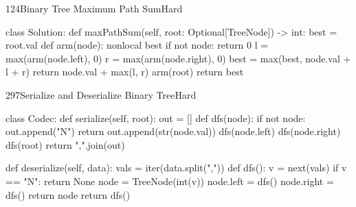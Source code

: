 \begin{problem}{124}{Binary Tree Maximum Path Sum}{Hard}
\begin{code}
class Solution:
    def maxPathSum(self, root: Optional[TreeNode]) -> int:
        best = root.val
        def arm(node):
            nonlocal best
            if not node:
                return 0
            l = max(arm(node.left), 0)
            r = max(arm(node.right), 0)
            best = max(best, node.val + l + r)
            return node.val + max(l, r)
        arm(root)
        return best
\end{code}
\end{problem}

\begin{problem}{297}{Serialize and Deserialize Binary Tree}{Hard}
\begin{code}
class Codec:
    def serialize(self, root):
        out = []
        def dfs(node):
            if not node:
                out.append("N")
                return
            out.append(str(node.val))
            dfs(node.left)
            dfs(node.right)
        dfs(root)
        return ",".join(out)

    def deserialize(self, data):
        vals = iter(data.split(","))
        def dfs():
            v = next(vals)
            if v == "N":
                return None
            node = TreeNode(int(v))
            node.left = dfs()
            node.right = dfs()
            return node
        return dfs()
\end{code}
\end{problem}
